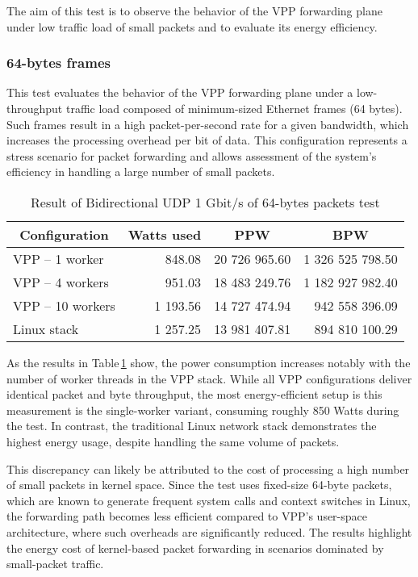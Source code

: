 The aim of this test is to observe the behavior of the VPP forwarding plane under low traffic load of small packets and to evaluate its energy efficiency.

\subsubsection{64-bytes frames}
This test evaluates the behavior of the VPP forwarding plane under a low-throughput traffic load composed of minimum-sized Ethernet frames (64 bytes). 
Such frames result in a high packet-per-second rate for a given bandwidth, which increases the processing overhead per bit of data. 
This configuration represents a stress scenario for packet forwarding and allows assessment of the system’s efficiency in handling a large number of small packets.

\begin{table}[h!]
\centering
\begin{tabular}{|l|r|r|r|}
\hline
\multicolumn{1}{|c|}{\textbf{Configuration}} &
\multicolumn{1}{c|}{\textbf{Watts used}} &
\multicolumn{1}{c|}{\textbf{PPW}} &
\multicolumn{1}{c|}{\textbf{BPW}} \\
\hline
VPP -- 1 worker & 848.08 & 20 726 965.60 & 1 326 525 798.50 \\
VPP -- 4 workers & 951.03 & 18 483 249.76 & 1 182 927 982.40 \\
VPP -- 10 workers & 1 193.56 & 14 727 474.94 & 942 558 396.09 \\
Linux stack & 1 257.25 & 13 981 407.81 & 894 810 100.29 \\
\hline
\end{tabular}
\caption{Result of Bidirectional UDP 1 Gbit/s of 64-bytes packets test}
\label{tab:udp:one}
\end{table}

As the results in Table \ref{tab:udp:one} show, the power consumption increases notably with the number of worker threads in the VPP stack. 
While all VPP configurations deliver identical packet and byte throughput, the most energy-efficient setup is this measurement is the single-worker variant, consuming roughly 850 Watts during the test. 
In contrast, the traditional Linux network stack demonstrates the highest energy usage, despite handling the same volume of packets.

This discrepancy can likely be attributed to the cost of processing a high number of small packets in kernel space. 
Since the test uses fixed-size 64-byte packets, which are known to generate frequent system calls and context switches in Linux, 
the forwarding path becomes less efficient compared to VPP’s user-space architecture, where such overheads are significantly reduced. 
The results highlight the energy cost of kernel-based packet forwarding in scenarios dominated by small-packet traffic.

